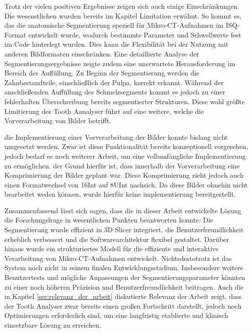 Trotz der vielen positiven Ergebnisse zeigen sich auch einige Einschränkungen.
Die wesenstlichen wurden bereits im Kapitel Limitation erwähnt. So kommt es, das
die anatomische Segmentierung speziell für Mikro-CT-Aufnahmen im ISQ-Format
entwickelt wurde, wodurch bestimmte Parameter und Schwellwerte fest im Code hinterlegt
wurden. Dies kann die Flexibilität bei der Nutzung mit anderen Bildformaten
einschränken. Eine detaillierte Analyse der Segmentierungsergebnisse zeigte zudem
eine unerwartete Herausforderung im Bereich der Auffüllung. Zu Beginn der
Segmentierung werden die Zahnbestandteile, einschließlich der Pulpa, korrekt
erkannt. Während der anschließenden Auffüllung des Schmelzsegments kommt es jedoch
zu einer fehlerhaften Überschreibung bereits segmentierter Strukturen. Diese
wohl größte Limitierung des Tooth Aanalyser führt auf eine weitere, welche die Vorverarbeitung
von Bilder betrifft.

die Implementierung einer Vorverarbeitung der Bilder konnte bislang nicht umgesetzt
werden. Zwar ist diese Funktionalität bereits konzeptionell vorgesehen, jedoch bedarf
es noch weiterer Arbeit, um eine vollumfängliche Implementierung zu ermöglichen.
der Grund hierfür ist, dass innerhalb der Vorverarbeitung eine Komprimierung der
Bilder geplant war. Diese Komprimierung zieht jedoch auch einen Formatwechsel von
\ac{16Int} auf \ac{8UInt} nachsich. Da diese Bilder ohnehin nicht bearbeitet
weden können, wurde hierfür keine implementierung bereitgestellt.

Zusammenfassend lässt sich sagen, dass die in dieser Arbeit entwickelte Lösung
die Forschungsfrage in wesentlichen Punkten beantworten konnte: Die Segmentierung
wurde effizient in 3D Slicer integriert, die Benutzerfreundlichkeit erheblich
verbessert und die Softwarearchitektur flexibel gestaltet. Darüber hinaus wurde ein
strukturiertes Modell für die effiziente und interaktive Verarbeitung von Mikro-CT-Aufnahmen
entwickelt. Nichtsdestotrotz ist das System noch nicht in seinem finalen
Entwicklungsstadium. Insbesondere weitere Benutzertests und mögliche Anpassungen
der Segmentierungsparameter könnten zu einer noch höheren Präzision und Benutzerfreundlichkeit
beitragen. Auch die in Kapitel \ref{sec:relevanz_der_arbeit} diskutierte
Relevanz der Arbeit zeigt, dass der Tooth Analyser zwar bereits einen großen Fortschritt
darstellt, jedoch noch Optimierungen erforderlich sind, um eine langfristig etablierte
und klinisch einsetzbare Lösung zu erreichen.
